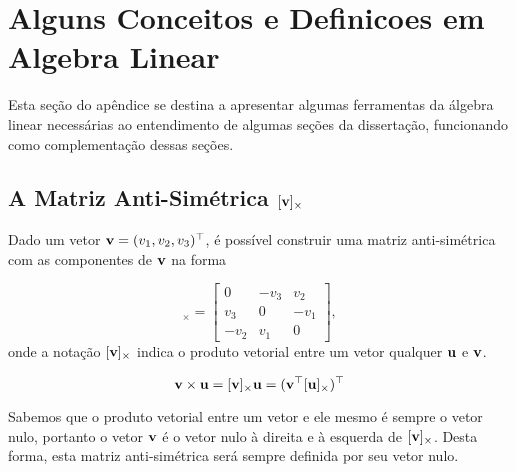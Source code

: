 \section{Alguns Conceitos e Definicoes em Algebra Linear}
Esta seção do apêndice se destina a apresentar algumas ferramentas da álgebra linear necessárias ao entendimento de algumas seções da dissertação, funcionando como complementação dessas seções.

\subsection{A Matriz Anti-Simétrica $[{\bf v}]_\times$}\label{sec.anti-simetrica}
Dado um vetor ${\bf v}=(v_1,v_2,v_3)^\top$, é possível construir uma matriz anti-simétrica com as componentes de ${\bf v}$ na forma

\begin{equation*}
[{\bf v}]_\times=
\begin{bmatrix}
0&-v_3&v_2\\
v_3&0&-v_1\\
-v_2&v_1&0
\end{bmatrix},
\end{equation*}
onde a notação $[{\bf v}]_\times$ indica o produto vetorial entre um vetor qualquer ${\bf u}$ e ${\bf v}$. 

\begin{equation*}
{\bf v} \times {\bf u} = [{\bf v}]_\times {\bf u} = ({\bf v}^\top [{\bf u}]_\times)^\top
\end{equation*}

Sabemos que o produto vetorial entre um vetor e ele mesmo é sempre o vetor nulo, portanto o vetor ${\bf v}$ é o vetor nulo à direita e à esquerda de $[{\bf v}]_\times$. Desta forma, esta matriz anti-simétrica será sempre definida por seu vetor nulo.  

